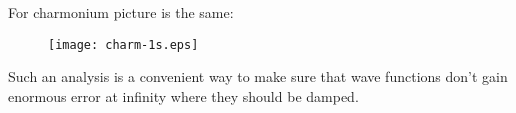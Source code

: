 For charmonium picture is the same:

\begin{figure}[H] \begin{floatrow}
        {\texttt{[image: charm-1s.eps]}}
\end{floatrow} \end{figure}

Such an analysis is a convenient way to make sure that wave functions don't gain enormous error at infinity where they should be damped. 



